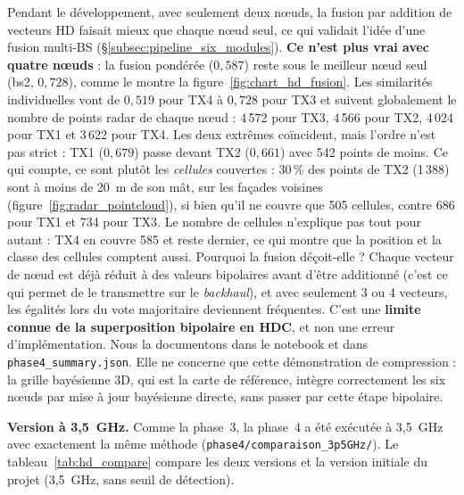 \documentclass[12pt,a4paper,titlepage]{article}
\begin{document}
Pendant le développement, avec seulement deux n\oe uds, la fusion par addition de vecteurs HD faisait mieux que chaque n\oe ud seul, ce qui validait l'idée d'une fusion multi-BS (\S\ref{subsec:pipeline_six_modules}). \textbf{Ce n'est plus vrai avec quatre n\oe uds} : la fusion pondérée ($0{,}587$) reste sous le meilleur n\oe ud seul (bs2, $0{,}728$), comme le montre la figure~\ref{fig:chart_hd_fusion}. Les similarités individuelles vont de $0{,}519$ pour TX4 à $0{,}728$ pour TX3 et suivent globalement le nombre de points radar de chaque n\oe ud : 4\,572 pour TX3, 4\,566 pour TX2, 4\,024 pour TX1 et 3\,622 pour TX4. Les deux extrêmes coïncident, mais l'ordre n'est pas strict : TX1 ($0{,}679$) passe devant TX2 ($0{,}661$) avec 542 points de moins. Ce qui compte, ce sont plutôt les \emph{cellules} couvertes : 30\,\% des points de TX2 (1\,388) sont à moins de 20~m de son mât, sur les façades voisines (figure~\ref{fig:radar_pointcloud}), si bien qu'il ne couvre que 505 cellules, contre 686 pour TX1 et 734 pour TX3. Le nombre de cellules n'explique pas tout pour autant : TX4 en couvre 585 et reste dernier, ce qui montre que la position et la classe des cellules comptent aussi. Pourquoi la fusion déçoit-elle ? Chaque vecteur de n\oe ud est déjà réduit à des valeurs bipolaires avant d'être additionné (c'est ce qui permet de le transmettre sur le \textit{backhaul}), et avec seulement 3 ou 4 vecteurs, les égalités lors du vote majoritaire deviennent fréquentes. C'est une \textbf{limite connue de la superposition bipolaire en HDC}, et non une erreur d'implémentation. Nous la documentons dans le notebook et dans \texttt{phase4\_summary.json}. Elle ne concerne que cette démonstration de compression : la grille bayésienne 3D, qui est la carte de référence, intègre correctement les six n\oe uds par mise à jour bayésienne directe, sans passer par cette étape bipolaire.

\textbf{Version à 3,5~GHz.} Comme la phase~3, la phase~4 a été exécutée à 3,5~GHz avec exactement la même méthode (\texttt{phase4/comparaison\_3p5GHz/}). Le tableau~\ref{tab:hd_compare} compare les deux versions et la version initiale du projet (3,5~GHz, sans seuil de détection).
\end{document}

